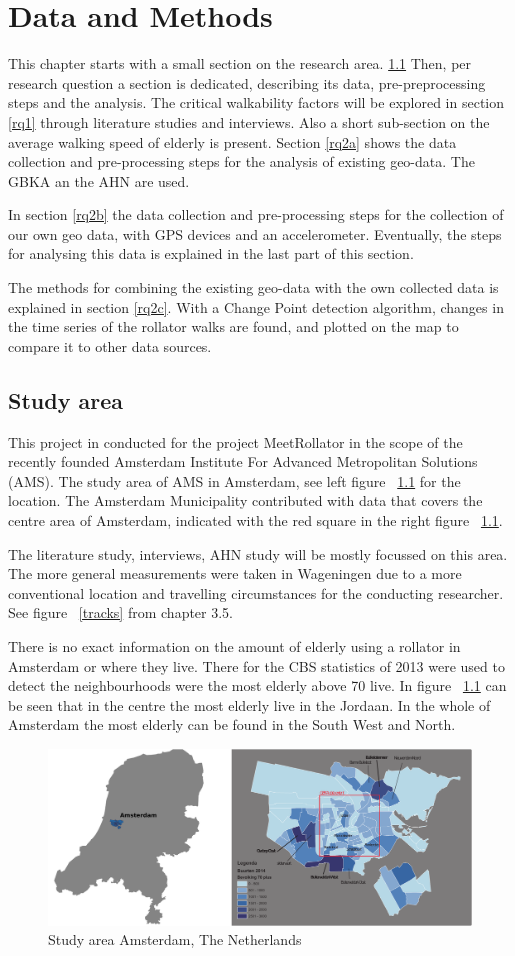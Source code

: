 \chapter[Data and Methods]{Data and Methods}

This chapter starts with a small section on the research area. \ref{area}
Then, per research question a section is dedicated, describing its data, pre-preprocessing steps and the analysis. The critical walkability factors will be explored in section \ref{rq1} through literature studies and interviews. Also a short sub-section on the average walking speed of elderly is present. 
Section \ref{rq2a} shows the data collection and pre-processing steps for the analysis of existing geo-data. The GBKA an the AHN are used.

In section \ref{rq2b} the data collection and pre-processing steps for the collection of our own geo data, with GPS devices and an accelerometer. Eventually, the steps for analysing this data is explained in the last part of this section.

The methods for combining the existing geo-data with the own collected data is explained in section \ref{rq2c}. With a Change Point detection algorithm, changes in the time series of the rollator walks are found, and plotted on the map to compare it to other data sources. 

\section{Study area}\label{area}
This project in conducted for the project MeetRollator in the scope of the recently founded Amsterdam Institute For Advanced Metropolitan Solutions (AMS). The study area of AMS in Amsterdam, see left figure ~\ref{kaart} for the location. The Amsterdam Municipality contributed with data that covers the centre area of Amsterdam, indicated with the red square in the right figure ~\ref{kaart}. 

The literature study, interviews, AHN study will be mostly focussed on this area. The more general measurements were taken in Wageningen due to a more conventional location and travelling circumstances for the conducting researcher. See figure ~\ref{tracks} from chapter 3.5. 

There is no exact information on the amount of elderly using a rollator in Amsterdam or where they live. There for the CBS statistics of 2013 were used to detect the neighbourhoods were the most elderly above 70 live. In figure ~\ref{kaart} can be seen that in the centre the most elderly live in the Jordaan. In the whole of Amsterdam the most elderly can be found in the South West and North.  

\begin{figure}[ht]
\includegraphics[width=\textwidth]{img/SA_StudyArea.pdf}
\centering
\caption{Study area Amsterdam, The Netherlands\label{kaart}}
\end{figure}